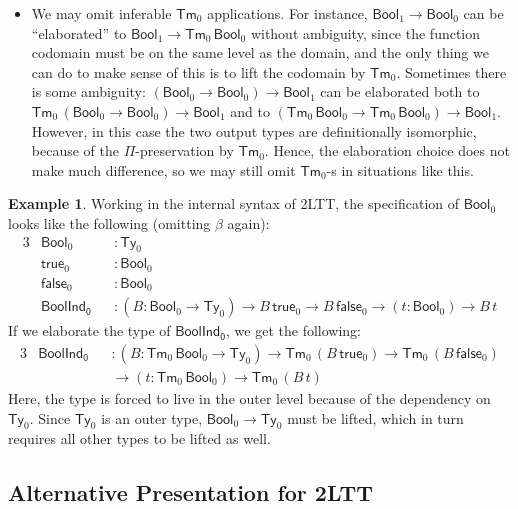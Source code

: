 \documentclass[12pt,a4paper,twoside,openany]{book}
\theoremstyle{remark}
\newtheorem{notation}{Notation}
\theoremstyle{definition}
\newtheorem{myexample}{Example}
\theoremstyle{theorem}
\newcommand{\ms}[1]{\mathsf{#1}}
\newcommand{\suc}{\ms{suc}}
\newcommand{\Tm}{\mathsf{Tm}}
\newcommand{\Ty}{\mathsf{Ty}}
\newcommand{\Bool}{\ms{Bool}}
\newcommand{\true}{\ms{true}}
\newcommand{\false}{\ms{false}}
\begin{document}
\begin{itemize}
\begin{notation}
      we write $\lambda_0\,x.\,\suc_0\,(\suc_0\,x)$ for the above example. We
      may also group multiple $\lambda_0$ binders together the same way as with
      $\lambda$.
    \end{notation}
  \item
    We may omit inferable $\Tm_0$ applications. For instance, $\Bool_1 \to
    \Bool_0$ can be ``elaborated'' to $\Bool_1 \to \Tm_0\,\Bool_0$ without
    ambiguity, since the function codomain must be on the same level as the
    domain, and the only thing we can do to make sense of this is to lift the
    codomain by $\Tm_0$. Sometimes there is some ambiguity: $(\Bool_0 \to
    \Bool_0) \to \Bool_1$ can be elaborated both to $\Tm_0\,(\Bool_0 \to
    \Bool_0) \to \Bool_1$ and to $(\Tm_0\,\Bool_0 \to \Tm_0\,\Bool_0) \to
    \Bool_1$. However, in this case the two output types are definitionally
    isomorphic, because of the $\Pi$-preservation by $\Tm_0$. Hence, the
    elaboration choice does not make much difference, so we may still omit
    $\Tm_0$-s in situations like this.
\end{itemize}

\begin{myexample} Working in the internal syntax of 2LTT, the specification of $\Bool_0$
looks like the following (omitting $\beta$ again):
\begin{alignat*}{3}
  &\Bool_0  &&: \Ty_0\\
  &\true_0  &&: \Bool_0\\
  &\false_0 &&: \Bool_0\\
  & \ms{BoolInd_0} &&: (B : \Bool_0 \to \Ty_0) \to B\,\true_0 \to B\,\false_0 \to (t : \Bool_0) \to B\,t
\end{alignat*}
If we elaborate the type of $\ms{BoolInd_0}$, we get the following:
\begin{alignat*}{3}
  & \ms{BoolInd_0} &&: (B : \Tm_0\,\Bool_0 \to \Ty_0) \to \Tm_0\,(B\,\true_0) \to \Tm_0\,(B\,\false_0)\\
  & && \to (t : \Tm_0\,\Bool_0) \to \Tm_0\,(B\,t)
\end{alignat*}
Here, the type is forced to live in the outer level because of the dependency on
$\Ty_0$. Since $\Ty_0$ is an outer type, $\Bool_0 \to \Ty_0$ must be lifted, which
in turn requires all other types to be lifted as well.
\end{myexample}

\subsection{Alternative Presentation for 2LTT}
\end{document}

